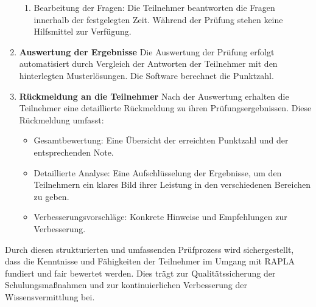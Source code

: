 \begin{enumerate}
\begin{enumerate}
        \item Bearbeitung der Fragen: Die Teilnehmer beantworten die Fragen innerhalb der festgelegten Zeit. Während der Prüfung stehen keine Hilfsmittel zur Verfügung.
    \end{enumerate}
    \item \textbf{Auswertung der Ergebnisse}
Die Auswertung der Prüfung erfolgt automatisiert durch Vergleich der Antworten der Teilnehmer mit den hinterlegten Musterlösungen. Die Software berechnet die Punktzahl.
    \item \textbf{Rückmeldung an die Teilnehmer}
Nach der Auswertung erhalten die Teilnehmer eine detaillierte Rückmeldung zu ihren Prüfungsergebnissen. Diese Rückmeldung umfasst:
    \begin{itemize}
        \item Gesamtbewertung: Eine Übersicht der erreichten Punktzahl und der entsprechenden Note.
        \item Detaillierte Analyse: Eine Aufschlüsselung der Ergebnisse, um den Teilnehmern ein klares Bild ihrer Leistung in den verschiedenen Bereichen zu geben.
        \item Verbesserungsvorschläge: Konkrete Hinweise und Empfehlungen zur Verbesserung.
    \end{itemize}
\end{enumerate}
Durch diesen strukturierten und umfassenden Prüfprozess wird sichergestellt, dass die Kenntnisse und Fähigkeiten der Teilnehmer im Umgang mit RAPLA fundiert und fair bewertet werden. Dies trägt zur Qualitätssicherung der Schulungsmaßnahmen und zur kontinuierlichen Verbesserung der Wissensvermittlung bei.


